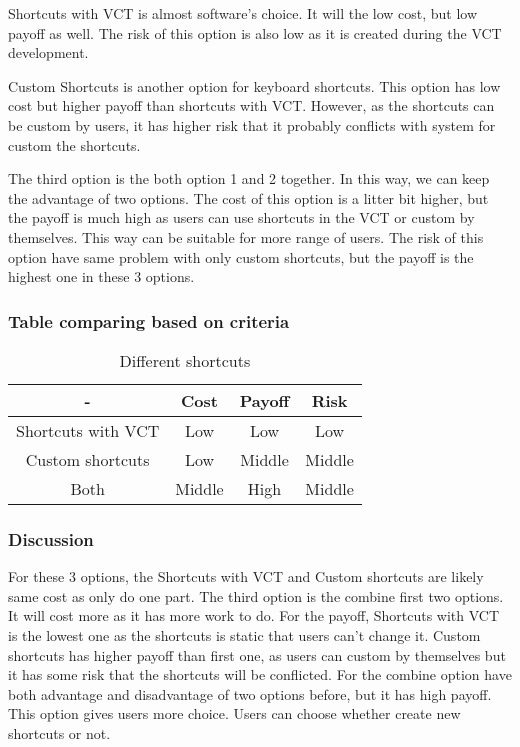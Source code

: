 \documentclass [10pt]{article}
\begin{document}
Shortcuts with VCT is almost software’s choice. It will the low cost, but low payoff as well. The risk of this option is also low as it is created during the VCT development. \par
Custom Shortcuts is another option for keyboard shortcuts. This option has low cost but higher payoff than shortcuts with VCT. However, as the shortcuts can be custom by users, it has higher risk that it probably conflicts with system for custom the shortcuts. \par
The third option is the both option 1 and 2 together. In this way, we can keep the advantage of two options. The cost of this option is a litter bit higher, but the payoff is much high as users can use shortcuts in the VCT or custom by themselves. This way can be suitable for more range of users. The risk of this option have same problem with only custom shortcuts, but the payoff is the highest one in these 3 options. 

\subsubsection{Table comparing based on criteria}
\begin{table}[h]
\caption{Different shortcuts}
\label{table_example}
\begin{center}
\begin{tabular}{|c||c||c||c|}
\hline
 - & Cost & Payoff & Risk \\
\hline
Shortcuts with VCT & Low & Low & Low \\
\hline
Custom shortcuts & Low & Middle & Middle \\
\hline
Both & Middle & High & Middle \\
\hline
\end{tabular}
\end{center}
\end{table}

\subsubsection{Discussion}
For these 3 options, the Shortcuts with VCT and Custom shortcuts are likely same cost as only do one part. The third option is the combine first two options. It will cost more as it has more work to do. For the payoff, Shortcuts with VCT is the lowest one as the shortcuts is static that users can’t change it. Custom shortcuts has higher payoff than first one, as users can custom by themselves but it has some risk that the shortcuts will be conflicted. For the combine option have both advantage and disadvantage of two options before, but it has high payoff. This option gives users more choice. Users can choose whether create new shortcuts or not. 
\end{document}
